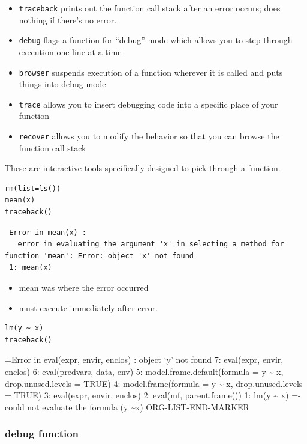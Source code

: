 \documentclass[11pt]{article}
\begin{document}
\begin{itemize}
\item \texttt{traceback} prints out the function call stack after an error
  occurs; does nothing if there's no error.
\item \texttt{debug} flags a function for ``debug'' mode which allows you to step
  through execution one line at a time
\item \texttt{browser} suspends execution of a function wherever it is called
  and puts things into debug mode
\item \texttt{trace} allows you to insert debugging code into a specific place
  of your function
\item \texttt{recover} allows you to modify the behavior so that you can browse
  the function call stack
\end{itemize}

These are interactive tools specifically designed to pick through a function.


\begin{verbatim}
rm(list=ls())
mean(x)
traceback()
\end{verbatim}

\begin{verbatim}
 Error in mean(x) : 
   error in evaluating the argument 'x' in selecting a method for function 'mean': Error: object 'x' not found
 1: mean(x)
\end{verbatim}

\begin{itemize}
\item mean was where the error occurred
\item must execute immediately after error.
\end{itemize}


\begin{verbatim}
lm(y ~ x)
traceback()
\end{verbatim}

=Error in eval(expr, envir, enclos) : object `y' not found
7: eval(expr, envir, enclos)
6: eval(predvars, data, env)
5: model.frame.default(formula = y \~{} x, drop.unused.levels = TRUE)
4: model.frame(formula = y \~{} x, drop.unused.levels = TRUE)
3: eval(expr, envir, enclos)
2: eval(mf, parent.frame())
1: lm(y \~{} x)
=- could not evaluate the formula (y \~{}x)
ORG-LIST-END-MARKER
\subsubsection{debug function}
\label{sec-2-5-3}
\end{document}
